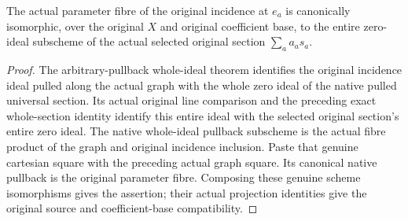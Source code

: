 \begin{theorem}
\label{thm:kn-nadel-bertini-original-hypersurface-fibre}
\leanok
{}
The actual parameter fibre of the original incidence at $e_a$ is
canonically isomorphic, over the original $X$ and original coefficient
base, to the entire zero-ideal subscheme of the actual selected original
section $\sum_a a_a s_a$.
\end{theorem}
\begin{proof}
The arbitrary-pullback whole-ideal theorem identifies the original
incidence ideal pulled along the actual graph with the whole zero ideal
of the native pulled universal section. Its actual original line
comparison and the preceding exact whole-section identity identify this
entire ideal with the selected original section's entire zero ideal.
The native whole-ideal pullback subscheme is the actual fibre product of
the graph and original incidence inclusion. Paste that genuine cartesian
square with the preceding actual graph square. Its canonical native
pullback is the original parameter fibre. Composing these genuine scheme
isomorphisms gives the assertion; their actual projection identities give
the original source and coefficient-base compatibility.
\end{proof}

